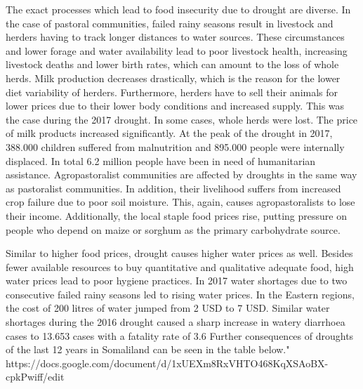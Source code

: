 {{The exact processes which lead to food insecurity due to drought are diverse. In the case of pastoral communities, failed rainy seasons result in livestock and herders having to track longer distances to water sources. These circumstances and lower forage and water availability lead to poor livestock health, increasing livestock deaths and lower birth rates, which can amount to the loss of whole herds. Milk production decreases drastically, which is the reason for the lower diet variability of herders. Furthermore, herders have to sell their animals for lower prices due to their lower body conditions and increased supply. This was the case during the 2017 drought. In some cases, whole herds were lost. The price of milk products increased significantly. At the peak of the drought in 2017, 388.000 children suffered from malnutrition and 895.000 people were internally displaced. In total 6.2 million people have been in need of humanitarian assistance.
Agropastoralist communities are affected by droughts in the same way as pastoralist communities. In addition, their livelihood suffers from increased crop failure due to poor soil moisture. This, again, causes agropastoralists to lose their income. Additionally, the local staple food prices rise, putting pressure on people who depend on maize or sorghum as the primary carbohydrate source. 

Similar to higher food prices, drought causes higher water prices as well. Besides fewer available resources to buy quantitative and qualitative adequate food, high water prices lead to poor hygiene practices. In 2017 water shortages due to two consecutive failed rainy seasons led to rising water prices. In the Eastern regions, the cost of 200 litres of water jumped from 2 USD to 7 USD. Similar water shortages during the 2016 drought caused a sharp increase in watery diarrhoea cases to 13.653 cases with a fatality rate of 3.6 %
Further consequences of droughts of the last 12 years in Somaliland can be seen in the table below."
https://docs.google.com/document/d/1xUEXm8RxVHTO468KqXSAoBX-cpkPwiff/edit



}}
